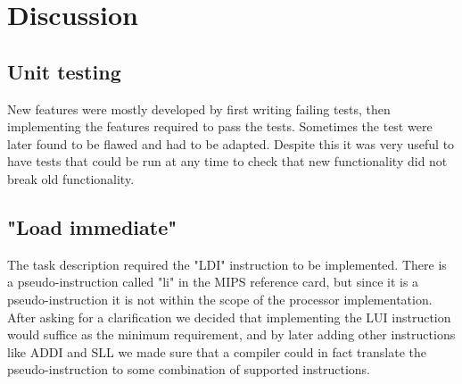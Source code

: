 \chapter{Discussion}
\section{Unit testing}
New features were mostly developed by first writing failing tests,
then implementing the features required to pass the tests.
Sometimes the test were later found to be flawed and had to be adapted.
Despite this it was very useful to have tests that could be run at any time to check that new functionality did not break old functionality.

\section{"Load immediate"}
The task description required the "LDI" instruction to be implemented.
There is a pseudo-instruction called "li" in the MIPS reference card,
but since it is a pseudo-instruction it is not within the scope of the processor implementation.
After asking for a clarification we decided that implementing the LUI instruction would suffice as the minimum requirement,
and by later adding other instructions like ADDI and SLL we made sure that a compiler could in fact translate the pseudo-instruction to some combination of supported instructions.

